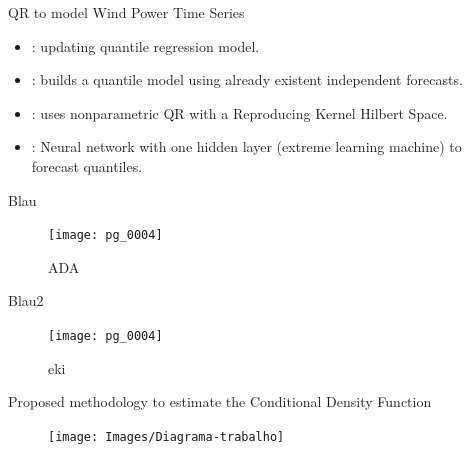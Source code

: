 \begin{frame}{QR to model Wind Power Time Series}
	\begin{itemize}
		\item \cite{moller_time-adaptive_2008}: updating quantile regression model.
		\item \cite{nielsen2006}: builds a quantile model using already existent independent forecasts.
		\item \cite{gallego-castillo_-line_2016}: uses nonparametric QR with a Reproducing Kernel Hilbert Space.
		\item \cite{wan2016}: Neural network with one hidden layer (extreme learning machine) to forecast quantiles.
	\end{itemize}
\end{frame}

\begin{frame}{Blau}
\begin{figure}
\begin{center}
	\texttt{[image: pg\_0004]}
\end{center}
\caption{ADA}
\end{figure}
\end{frame}

\begin{frame}{Blau2}
	\begin{figure}
	\begin{center}
		\texttt{[image: pg\_0004]}
	\end{center}
	\caption{eki}
	\end{figure}
\end{frame}
	


\begin{frame}{Proposed methodology to estimate the Conditional Density Function}
\begin{figure}
\begin{center}
	\texttt{[image: Images/Diagrama-trabalho]}
\end{center}
\end{figure}
\end{frame}






